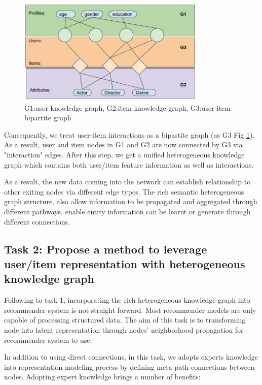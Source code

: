 \begin{figure}[!h]
    \centering
    \includegraphics[width=0.8\textwidth]{figs/ikdiagram.png}
    \caption{G1:user knowledge graph, G2:item knowledge graph, G3:user-item bipartite graph}\label{fig:ikgraph}
\end{figure}

Consequently, we treat user-item interactions as a bipartite graph (as G3 Fig \ref{fig:ikgraph}). As a result, user and item nodes in G1 and G2 are now connected by G3 via "interaction" edges. After this step, we get a unified heterogeneous knowledge graph which contains both user/item feature information as well as interactions.

As a result, the new data coming into the network can establish relationship to other exiting nodes via different edge types. The rich semantic heterogeneous graph structure, also allow information to be propagated and aggregated through different pathways, enable entity information can be learnt or generate through different connections.


\subsection*{Task 2: Propose a method to leverage user/item representation with heterogeneous knowledge graph}

Following to task 1, incorporating the rich heterogeneous knowledge graph into recommender system is not straight forward. Most recommender models are only capable of processing structured data. The aim of this task is to transforming node into latent representation through nodes' neighborhood propagation for recommender system to use.

In addition to using direct connections, in this task, we adopts experts knowledge into representation modeling process by defining meta-path connections between nodes. Adopting expert knowledge brings a number of benefits:

